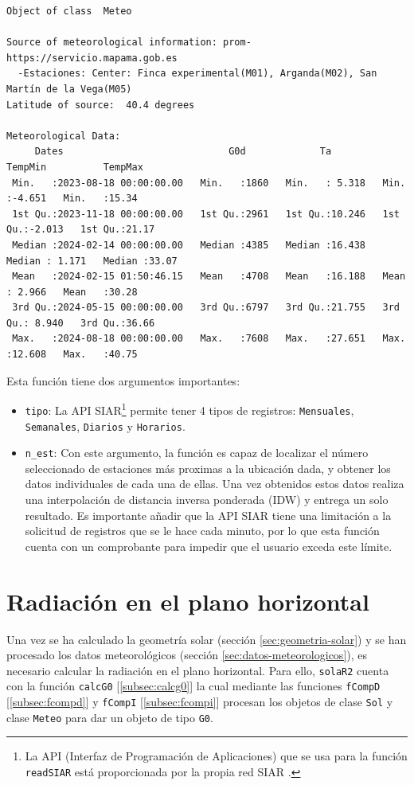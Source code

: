 \begin{verbatim}
Object of class  Meteo 

Source of meteorological information: prom-https://servicio.mapama.gob.es 
  -Estaciones: Center: Finca experimental(M01), Arganda(M02), San Martín de la Vega(M05) 
Latitude of source:  40.4 degrees

Meteorological Data:
     Dates                             G0d             Ta            TempMin          TempMax     
 Min.   :2023-08-18 00:00:00.00   Min.   :1860   Min.   : 5.318   Min.   :-4.651   Min.   :15.34  
 1st Qu.:2023-11-18 00:00:00.00   1st Qu.:2961   1st Qu.:10.246   1st Qu.:-2.013   1st Qu.:21.17  
 Median :2024-02-14 00:00:00.00   Median :4385   Median :16.438   Median : 1.171   Median :33.07  
 Mean   :2024-02-15 01:50:46.15   Mean   :4708   Mean   :16.188   Mean   : 2.966   Mean   :30.28  
 3rd Qu.:2024-05-15 00:00:00.00   3rd Qu.:6797   3rd Qu.:21.755   3rd Qu.: 8.940   3rd Qu.:36.66  
 Max.   :2024-08-18 00:00:00.00   Max.   :7608   Max.   :27.651   Max.   :12.608   Max.   :40.75
\end{verbatim}

Esta función tiene dos argumentos importantes:
\begin{itemize}
\item \texttt{tipo}: La API SIAR\footnote{La API (Interfaz de Programación de Aplicaciones) que se usa para la función \texttt{readSIAR} está proporcionada por la propia red SIAR \cite{siar23}.} permite tener 4 tipos de registros: \texttt{Mensuales}, \texttt{Semanales}, \texttt{Diarios} y \texttt{Horarios}.
\item \texttt{n\_est}: Con este argumento, la función es capaz de localizar el número seleccionado de estaciones más proximas a la ubicación dada, y obtener los datos individuales de cada una de ellas. Una vez obtenidos estos datos realiza una interpolación de distancia inversa ponderada (IDW) y entrega un solo resultado. Es importante añadir que la API SIAR tiene una limitación a la solicitud de registros que se le hace cada minuto, por lo que esta función cuenta con un comprobante para impedir que el usuario exceda este límite.
\end{itemize}

\section{Radiación en el plano horizontal}
\label{sec:org3fa948b}
Una vez se ha calculado la geometría solar (sección \ref{sec:geometria-solar}) y se han procesado los datos meteorológicos (sección \ref{sec:datos-meteorologicos}), es necesario calcular la radiación en el plano horizontal. Para ello, \texttt{solaR2} cuenta con la función \texttt{calcG0} [\ref{subsec:calcg0}] la cual mediante las funciones \texttt{fCompD} [\ref{subsec:fcompd}] y \texttt{fCompI} [\ref{subsec:fcompi}] procesan los objetos de clase \texttt{Sol} y clase \texttt{Meteo} para dar un objeto de tipo \texttt{G0}.

